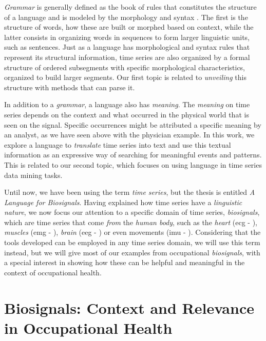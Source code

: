 \textit{Grammar} is generally defined as the book of rules that constitutes the structure of a language and is modeled by the morphology and syntax \cite{grammar}. The first is the structure of words, how these are built or morphed based on context, while the latter consists in organizing words in sequences to form larger linguistic units, such as sentences. Just as a language has morphological and syntax rules that represent its structural information, time series are also organized by a formal structure of ordered subsegments with specific morphological characteristics, organized to build larger segments. Our first topic is related to \textit{unveiling} this structure with methods that can parse it.
\par
In addition to a \textit{grammar}, a language also has \textit{meaning}. The \textit{meaning} on time series depends on the context and what occurred in the physical world that is seen on the signal. Specific occurrences might be attributed a specific meaning by an analyst, as we have seen above with the physician example. In this work, we explore a language to \textit{translate} time series into text and use this textual information as an expressive way of searching for meaningful events and patterns. This is related to our second topic, which focuses on using language in time series data mining tasks.
\par
Until now, we have been using the term \textit{time series}, but the thesis is entitled \textit{A Language for Biosignals}. Having explained how time series have a \textit{linguistic nature}, we now focus our attention to a specific domain of time series, \textit{biosignals}, which are time series that come \textit{from} the \textit{human body}, such as the \textit{heart} (\gls{ecg} - ), \textit{muscles} (\gls{emg} - ), \textit{brain} (\gls{eeg} - ) or even movements (\gls{imu} - ). Considering that the tools developed can be employed in any time series domain, we will use this term instead, but we will give most of our examples from occupational \textit{biosignals}, with a special interest in showing how these can be helpful and meaningful in the context of occupational health.

\section{Biosignals: Context and Relevance in Occupational Health} 
\label{sub:context2}

